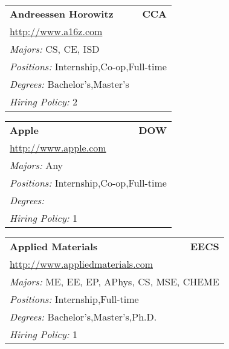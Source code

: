 \documentclass[twoside]{article}
\begin{document}
\begin{center}
\begin{multicols}{3}
\begin{FlushLeft}
\begin{minipage}{.9\columnwidth}
\end{minipage}
 
\begin{minipage}{.9\columnwidth}\begin{tabularx}{.95\columnwidth}{Xr}
                 {\Large\bf Andreessen Horowitz} & {\Large\bf CCA}\\
    \multicolumn{2}{p{.95\columnwidth}}{\url{http://www.a16z.com}}\\
    \multicolumn{2}{p{.95\columnwidth}}{\emph{Majors:} CS, CE, ISD}\\
    \multicolumn{2}{p{.95\columnwidth}}{\emph{Positions:} Internship,Co-op,Full-time}\\
    \multicolumn{2}{p{.95\columnwidth}}{\emph{Degrees:} Bachelor's,Master's}\\
    \multicolumn{2}{p{.95\columnwidth}}{\emph{Hiring Policy:} 2}\\
    \end{tabularx}
    
\end{minipage}
 
\begin{minipage}{.9\columnwidth}\begin{tabularx}{.95\columnwidth}{Xr}
                 {\Large\bf Apple} & {\Large\bf DOW}\\
    \multicolumn{2}{p{.95\columnwidth}}{\url{http://www.apple.com}}\\
    \multicolumn{2}{p{.95\columnwidth}}{\emph{Majors:} Any}\\
    \multicolumn{2}{p{.95\columnwidth}}{\emph{Positions:} Internship,Co-op,Full-time}\\
    \multicolumn{2}{p{.95\columnwidth}}{\emph{Degrees:} }\\
    \multicolumn{2}{p{.95\columnwidth}}{\emph{Hiring Policy:} 1}\\
    \end{tabularx}
    
\end{minipage}
 
\begin{minipage}{.9\columnwidth}\begin{tabularx}{.95\columnwidth}{Xr}
                 {\Large\bf Applied Materials} & {\Large\bf EECS}\\
    \multicolumn{2}{p{.95\columnwidth}}{\url{http://www.appliedmaterials.com}}\\
    \multicolumn{2}{p{.95\columnwidth}}{\emph{Majors:} ME, EE, EP, APhys, CS, MSE, CHEME}\\
    \multicolumn{2}{p{.95\columnwidth}}{\emph{Positions:} Internship,Full-time}\\
    \multicolumn{2}{p{.95\columnwidth}}{\emph{Degrees:} Bachelor's,Master's,Ph.D.}\\
    \multicolumn{2}{p{.95\columnwidth}}{\emph{Hiring Policy:} 1}\\
    \end{tabularx}
    

\end{minipage}
\end{FlushLeft}
\end{multicols}
\end{center}
\end{document}
